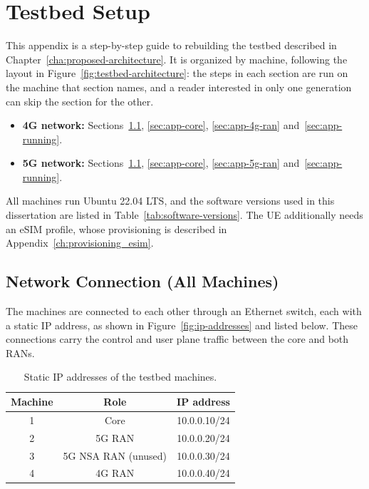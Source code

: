 
%

\chapter{Testbed Setup}
\label{app:testbed-setup}

This appendix is a step-by-step guide to rebuilding the testbed described in Chapter~\ref{cha:proposed-architecture}. It is organized by machine, following the layout in Figure~\ref{fig:testbed-architecture}: the steps in each section are run on the machine that section names, and a reader interested in only one generation can skip the section for the other.

\begin{itemize}
    \item \textbf{4G network:} Sections~\ref{sec:app-network}, \ref{sec:app-core}, \ref{sec:app-4g-ran} and~\ref{sec:app-running}.
    \item \textbf{5G network:} Sections~\ref{sec:app-network}, \ref{sec:app-core}, \ref{sec:app-5g-ran} and~\ref{sec:app-running}.
\end{itemize}

All machines run Ubuntu 22.04 LTS, and the software versions used in this dissertation are listed in Table~\ref{tab:software-versions}. The \gls{UE} additionally needs an eSIM profile, whose provisioning is described in Appendix~\ref{ch:provisioning_esim}.

\section{Network Connection (All Machines)}
\label{sec:app-network}

The machines are connected to each other through an Ethernet switch, each with a static IP address, as shown in Figure~\ref{fig:ip-addresses} and listed below. These connections carry the control and user plane traffic between the core and both \glspl{RAN}.

\begin{table}[htbp]
    \centering
    \begin{tabular}{|c|c|c|}
        \hline
        \textbf{Machine} & \textbf{Role} & \textbf{IP address} \\
        \hline
        1 & Core & 10.0.0.10/24 \\
        \hline
        2 & 5G \gls{RAN} & 10.0.0.20/24 \\
        \hline
        3 & 5G \gls{NSA} \gls{RAN} (unused) & 10.0.0.30/24 \\
        \hline
        4 & 4G \gls{RAN} & 10.0.0.40/24 \\
        \hline
    \end{tabular}
    \caption{Static IP addresses of the testbed machines.}
    \label{tab:app-ip-addresses}
\end{table}

